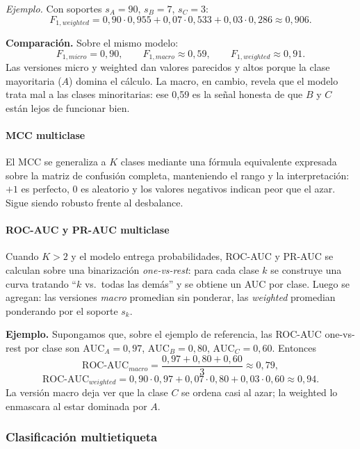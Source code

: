 \documentclass[12pt,oneside]{report}
\begin{document}
\emph{Ejemplo.} Con soportes $s_A=90$, $s_B=7$, $s_C=3$:
\[
F_{1,weighted}=0{,}90\cdot 0{,}955+0{,}07\cdot 0{,}533+0{,}03\cdot 0{,}286\approx 0{,}906.
\]

\textbf{Comparación.} Sobre el mismo modelo:
\[
F_{1,micro}=0{,}90,\qquad F_{1,macro}\approx 0{,}59,\qquad F_{1,weighted}\approx 0{,}91.
\]
Las versiones micro y weighted dan valores parecidos y altos porque la
clase mayoritaria ($A$) domina el cálculo. La macro, en cambio, revela
que el modelo trata mal a las clases minoritarias: ese 0{,}59 es la
señal honesta de que $B$ y $C$ están lejos de funcionar bien.

\paragraph{MCC multiclase}

El MCC se generaliza a $K$ clases mediante una fórmula equivalente
expresada sobre la matriz de confusión completa, manteniendo el rango y
la interpretación: $+1$ es perfecto, $0$ es aleatorio y los valores
negativos indican peor que el azar. Sigue siendo robusto frente al
desbalance.

\paragraph{ROC-AUC y PR-AUC multiclase}

Cuando $K>2$ y el modelo entrega probabilidades, ROC-AUC y PR-AUC se
calculan sobre una binarización \emph{one-vs-rest}: para cada clase $k$
se construye una curva tratando ``$k$ vs.\ todas las demás'' y se
obtiene un AUC por clase. Luego se agregan: las versiones \emph{macro}
promedian sin ponderar, las \emph{weighted} promedian ponderando por el
soporte $s_k$.

\textbf{Ejemplo.} Supongamos que, sobre el ejemplo de referencia, las
ROC-AUC one-vs-rest por clase son $\mathrm{AUC}_A=0{,}97$,
$\mathrm{AUC}_B=0{,}80$, $\mathrm{AUC}_C=0{,}60$. Entonces
\[
\mathrm{ROC\text{-}AUC}_{macro}=\frac{0{,}97+0{,}80+0{,}60}{3}\approx 0{,}79,
\]
\[
\mathrm{ROC\text{-}AUC}_{weighted}=0{,}90\cdot 0{,}97+0{,}07\cdot 0{,}80+0{,}03\cdot 0{,}60\approx 0{,}94.
\]
La versión macro deja ver que la clase $C$ se ordena casi al azar; la
weighted lo enmascara al estar dominada por $A$.

\subsubsection{Clasificación multietiqueta}
\end{document}
